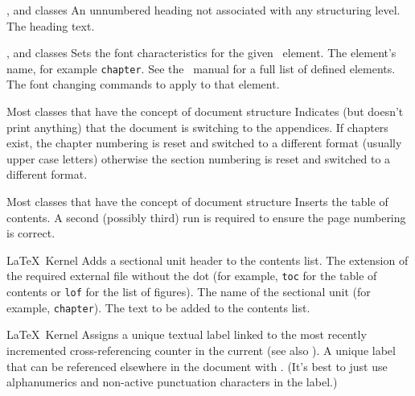 %
 {}%
 {,  and
   classes}%
 {An unnumbered heading not associated with any structuring level.}%
 {%
   \BeginArgList
     The heading text.
   \EndArgList
 }

%
 {}%
 {,  and
   classes}%
 {Sets the font characteristics for the given \koma\ element.}%
 {%
   \BeginArgList
      The element's name, for example
      \texttt{chapter}. See the \koma\ manual for a full list
      of defined elements.
      The font changing commands to apply
      to that element.
   \EndArgList
 }

%
 {}%
 {Most classes that have the concept of document structure}%
 {Indicates (but doesn't print anything) that the document is
  switching to the appendices. If chapters exist, the chapter
  numbering is reset and switched to a different format
  (usually upper case letters) otherwise the section numbering
  is reset and switched to a different format.}%
 {}

 {}%
 {Most classes that have the concept of document structure}%
 {Inserts the table of contents. A second (possibly third) run
  is required to ensure the page numbering is correct.}%
 {}

%
 {}%
 {\LaTeX\ Kernel}%
 {Adds a sectional unit header to the contents list.}%
 {%
   \BeginArgList
     The extension of the required external file
    without the dot (for example, \texttt{toc} for the table of
     contents or \texttt{lof} for the list of figures).
     The name of the sectional unit (for
     example, \texttt{chapter}).
     The text to be added to the contents list.
   \EndArgList
 }

%
 {}%
 {\LaTeX\ Kernel}%
 {Assigns a unique textual label linked to the most recently
  incremented cross-referencing counter in the current  (see
  also ).}%
 {%
   \BeginArgList
     A unique label that can be referenced
     elsewhere in the document with . (It's best to 
     just use alphanumerics and non-active punctuation characters in
     the label.)
   \EndArgList
 }

